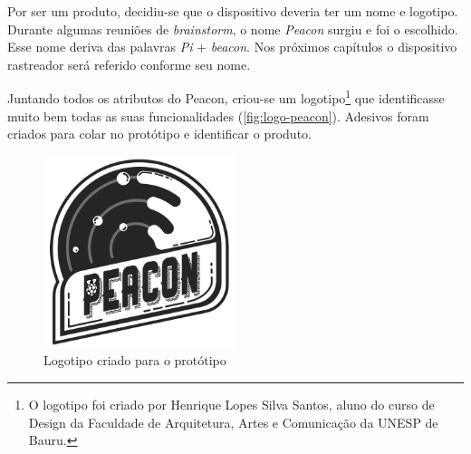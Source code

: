 Por ser um produto, decidiu-se que o dispositivo deveria ter um nome e logotipo. Durante algumas reuniões de \textit{brainstorm}, o nome \textit{Peacon} surgiu e foi o escolhido. Esse nome deriva das palavras \textit{Pi}  + \textit{beacon}. Nos próximos capítulos o dispositivo rastreador será referido conforme seu nome.

Juntando todos os atributos do Peacon, criou-se um logotipo\footnote{O logotipo foi criado por Henrique Lopes Silva Santos, aluno do curso de Design da Faculdade de Arquitetura, Artes e Comunicação da UNESP de Bauru.} que identificasse muito bem todas as suas funcionalidades (\autoref{fig:logo-peacon}). Adesivos foram criados para colar no protótipo e identificar o produto.

\begin{figure}[htb]
	\caption{\label{fig:logo-peacon}Logotipo criado para o protótipo}
	\begin{center}
		\includegraphics[width=0.5\textwidth]{img/logo-peacon.png}
	\end{center}
\end{figure}

